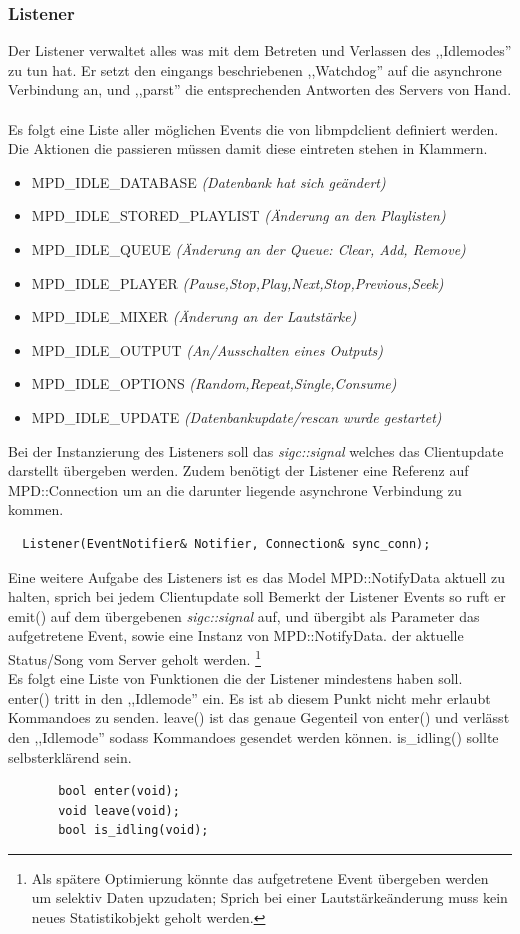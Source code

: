 \subsubsection{Listener}
Der Listener verwaltet alles was mit dem Betreten und Verlassen des ,,Idlemodes''
zu tun hat. Er setzt den eingangs beschriebenen ,,Watchdog'' auf die asynchrone Verbindung an,
und ,,parst'' die entsprechenden Antworten des Servers von Hand. 
\\
\\
Es folgt eine Liste aller möglichen Events die von libmpdclient definiert werden.
Die Aktionen die passieren müssen damit diese eintreten stehen in Klammern.
\begin{itemize}
    \item \small MPD\_IDLE\_DATABASE \it(Datenbank hat sich geändert)\rm
    \item \small MPD\_IDLE\_STORED\_PLAYLIST \it(Änderung an den Playlisten)\rm
    \item \small MPD\_IDLE\_QUEUE \it(Änderung an der Queue: Clear, Add, Remove)\rm
    \item \small MPD\_IDLE\_PLAYER \it(Pause,Stop,Play,Next,Stop,Previous,Seek)\rm
    \item \small MPD\_IDLE\_MIXER \it(Änderung an der Lautstärke)\rm
    \item \small MPD\_IDLE\_OUTPUT \it(An/Ausschalten eines Outputs)\rm
    \item \small MPD\_IDLE\_OPTIONS \it(Random,Repeat,Single,Consume)\rm
    \item \small MPD\_IDLE\_UPDATE \it(Datenbankupdate/rescan wurde gestartet)\rm
\end{itemize}
\normalsize
Bei der Instanzierung des Listeners soll das \textit{sigc::signal} welches das Clientupdate darstellt übergeben werden.
Zudem benötigt der Listener eine Referenz auf MPD::Connection um an die darunter liegende asynchrone Verbindung zu kommen.  
\begin{verbatim}
  Listener(EventNotifier& Notifier, Connection& sync_conn);
\end{verbatim}

Eine weitere Aufgabe des Listeners ist es das Model MPD::NotifyData aktuell zu halten, sprich bei jedem Clientupdate soll
Bemerkt der Listener Events so ruft er emit() auf dem übergebenen \textit{sigc::signal} auf,
und übergibt als Parameter das aufgetretene Event, sowie eine Instanz von MPD::NotifyData.
der aktuelle Status/Song vom Server geholt werden.
\footnote{Als spätere Optimierung könnte das aufgetretene Event übergeben werden um selektiv Daten upzudaten; Sprich bei einer Lautstärkeänderung muss kein neues Statistikobjekt geholt werden.}
\\
Es folgt eine Liste von Funktionen die der Listener mindestens haben soll.
\\
enter() tritt in den ,,Idlemode'' ein. Es ist ab diesem Punkt nicht mehr erlaubt Kommandoes zu senden.
leave() ist das genaue Gegenteil von enter() und verlässt den ,,Idlemode'' sodass Kommandoes gesendet werden können.  
is\_idling() sollte selbsterklärend sein.
\begin{verbatim}
       bool enter(void);
       void leave(void);
       bool is_idling(void);
\end{verbatim}

